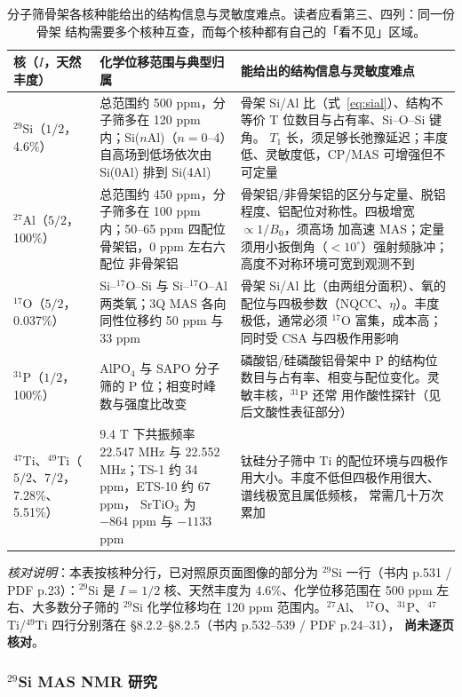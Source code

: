 \begin{table}[htbp]
\centering
\caption{分子筛骨架各核种能给出的结构信息与灵敏度难点。读者应看第三、四列：同一份骨架
结构需要多个核种互查，而每个核种都有自己的「看不见」区域。}
\label{tab:nuclei}
{\srcsize
\begin{tabularx}{\columnwidth}{@{}lXX@{}}
\toprule
核（$I$，天然丰度） & 化学位移范围与典型归属 & 能给出的结构信息与灵敏度难点 \\
\midrule
$^{29}$Si（$1/2$，4.6\%） &
总范围约 500 ppm，分子筛多在 120 ppm 内；Si($n$Al)（$n=0$--4）自高场到低场依次由
Si(0Al) 排到 Si(4Al) &
骨架 Si/Al 比（式~\ref{eq:sial}）、结构不等价 T 位数目与占有率、Si--O--Si 键角。
$T_1$ 长，须足够长弛豫延迟；丰度低、灵敏度低，CP/MAS 可增强但不可定量 \\
$^{27}$Al（$5/2$，100\%） &
总范围约 450 ppm，分子筛多在 100 ppm 内；50--65 ppm 四配位骨架铝，0 ppm 左右六配位
非骨架铝 &
骨架铝/非骨架铝的区分与定量、脱铝程度、铝配位对称性。四极增宽 $\propto1/B_0$，须高场
加高速 MAS；定量须用小扳倒角（$<10^\circ$）强射频脉冲；高度不对称环境可宽到观测不到 \\
$^{17}$O（$5/2$，0.037\%） &
Si--$^{17}$O--Si 与 Si--$^{17}$O--Al 两类氧；3Q MAS 各向同性位移约 50 ppm 与 33 ppm &
骨架 Si/Al 比（由两组分面积）、氧的配位与四极参数（NQCC、$\eta$）。丰度极低，通常必须
$^{17}$O 富集，成本高；同时受 CSA 与四极作用影响 \\
$^{31}$P（$1/2$，100\%） &
AlPO$_{4}$ 与 SAPO 分子筛的 P 位；相变时峰数与强度比改变 &
磷酸铝/硅磷酸铝骨架中 P 的结构位数目与占有率、相变与配位变化。灵敏丰核，$^{31}$P 还常
用作酸性探针（见后文酸性表征部分） \\
$^{47}$Ti、$^{49}$Ti（$5/2$、$7/2$，7.28\%、5.51\%） &
9.4 T 下共振频率 22.547 MHz 与 22.552 MHz；TS-1 约 34 ppm，ETS-10 约 67 ppm，
SrTiO$_{3}$ 为 $-864$ ppm 与 $-1133$ ppm &
钛硅分子筛中 Ti 的配位环境与四极作用大小。丰度不低但四极作用很大、谱线极宽且属低频核，
常需几十万次累加 \\
\bottomrule
\end{tabularx}}
\end{table}
\emph{核对说明}：本表按核种分行，已对照原页面图像的部分为 $^{29}$Si 一行（书内 p.531 /
PDF p.23）：$^{29}$Si 是 $I=1/2$ 核、天然丰度为 4.6\%、化学位移范围在 500
ppm 左右、大多数分子筛的 $^{29}$Si 化学位移均在 120 ppm 范围内。$^{27}$Al、
$^{17}$O、$^{31}$P、$^{47}$Ti/$^{49}$Ti 四行分别落在
§8.2.2--§8.2.5（书内 p.532--539 / PDF p.24--31），
\textbf{尚未逐页核对}。

\subsubsection{$^{29}$Si MAS NMR 研究}

